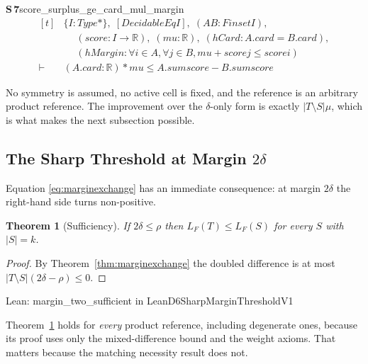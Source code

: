 \documentclass[conference]{IEEEtran}
\newtheorem{theorem}{Theorem}
\theoremstyle{definition}
\newcommand{\lean}[1]{\textsf{\footnotesize #1}}
\newcommand{\leanbox}[1]{%
  \par\vspace{2pt}\noindent
  {\footnotesize\textsf{Lean: #1}}\par\vspace{2pt}}
\begin{document}
\noindent\textbf{S\,7}\quad\lean{score\_surplus\_ge\_card\_mul\_margin}
{\footnotesize\[ \begin{aligned}[t]
&\{ \mathit{I} : \mathit{Type}*\},\; [\mathit{DecidableEq} \mathit{I}],\; (\mathit{A} \mathit{B} : \mathit{Finset} \mathit{I}),\\
&\quad \; (\mathit{score} : \mathit{I} \to \mathbb{R} ),\; (\mathit{mu} : \mathbb{R} ),\; (\mathit{hCard} : \mathit{A}.\mathit{card} = \mathit{B}.\mathit{card}),\\
&\quad \; (\mathit{hMargin} : \forall \mathit{i} \in \mathit{A}, \forall \mathit{j} \in \mathit{B}, \mathit{mu} + \mathit{score} \mathit{j} \leq \mathit{score} \mathit{i})\\
\vdash\;&(\mathit{A}.\mathit{card} : \mathbb{R} ) * \mathit{mu} \leq \mathit{A}.\mathit{sum} \mathit{score} - \mathit{B}.\mathit{sum} \mathit{score}
\end{aligned} \]}


No symmetry is assumed, no active cell is fixed, and the reference is an arbitrary product
reference. The improvement over the $\delta$-only form is exactly $|T\setminus S|\mu$, which
is what makes the next subsection possible.

\subsection{The Sharp Threshold at Margin $2\delta$}
\label{sec:threshold}

Equation \eqref{eq:marginexchange} has an immediate consequence: at margin $2\delta$ the
right-hand side turns non-positive.

\begin{theorem}[Sufficiency]
\label{thm:sufficient}
If $2\delta\leq\rho$ then $L_{F}(T)\leq L_{F}(S)$ for every $S$ with $|S|=k$.
\end{theorem}

\begin{proof}
By Theorem~\ref{thm:marginexchange} the doubled difference is at most
$|T\setminus S|(2\delta-\rho)\le0$.
\end{proof}

\leanbox{\lean{margin\_two\_sufficient} in \lean{LeanD6SharpMarginThresholdV1}}

Theorem~\ref{thm:sufficient} holds for \emph{every} product reference, including degenerate
ones, because its proof uses only the mixed-difference bound and the weight axioms. That
matters because the matching necessity result does not.
\end{document}
